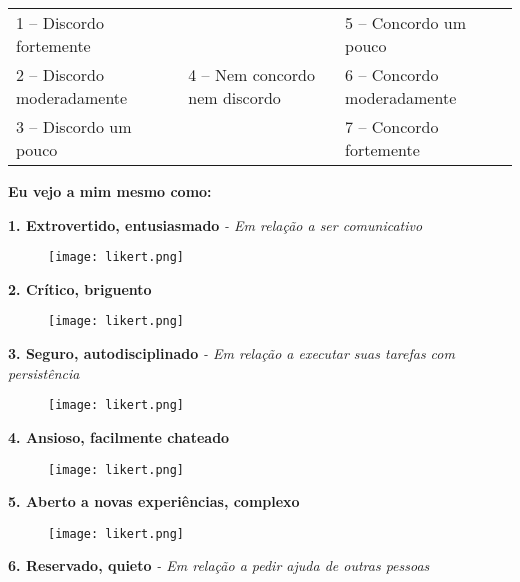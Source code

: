 \vspace{0.5cm}
\noindent
\begin{tabular}{lll}
\footnotesize 1 – Discordo fortemente 		& 																						& \footnotesize 5 – Concordo um pouco\\
\footnotesize 2 – Discordo moderadamente 	& \footnotesize 4 – Nem concordo nem discordo	& \footnotesize 6 – Concordo moderadamente\\
\footnotesize 3 – Discordo um pouco 			&																							& \footnotesize 7 – Concordo fortemente\\
\end{tabular}

\vspace{0.5cm}
\textbf{Eu vejo a mim mesmo como:}
\vspace{0.5cm}

\noindent
\textbf{1. Extrovertido, entusiasmado} \footnotesize \textsl{- Em relação a ser comunicativo}
\normalsize
 
\begin{figure}[!h]
\texttt{[image: likert.png]}
\end{figure}

\newpage%
\noindent
\textbf{2. Crítico, briguento}

\begin{figure}[!h]
\texttt{[image: likert.png]}
\end{figure}

\noindent  
\textbf{3. Seguro, autodisciplinado}   \footnotesize \textsl{- Em relação a executar suas tarefas com persistência}
\normalsize

\begin{figure}[!h]
\texttt{[image: likert.png]}
\end{figure}
 
\noindent
\textbf{4. Ansioso, facilmente chateado}

\begin{figure}[!h]
\texttt{[image: likert.png]}
\end{figure}

\noindent
\textbf{5. Aberto a novas experiências, complexo} 

\begin{figure}[!h]
\texttt{[image: likert.png]}
\end{figure}
 
\noindent
\textbf{6. Reservado, quieto}          \footnotesize \textsl{- Em relação a pedir ajuda de outras pessoas} \normalsize

